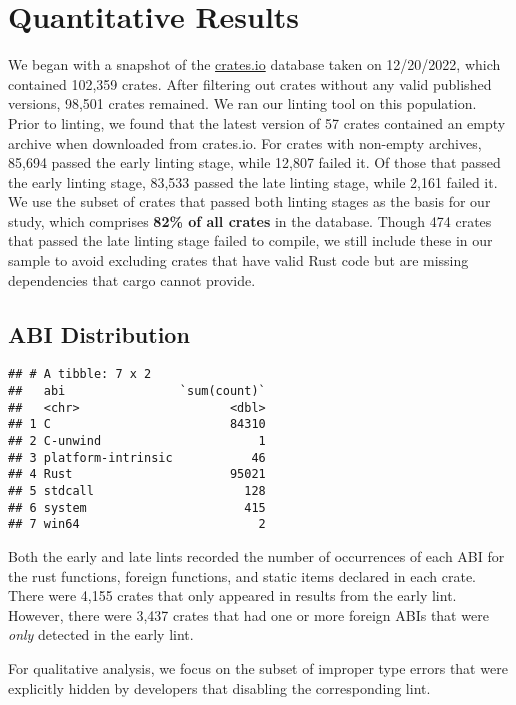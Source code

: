 \documentclass[
]{book}
\begin{document}
\hypertarget{quantitative-results}{%
\chapter{Quantitative Results}\label{quantitative-results}}

We began with a snapshot of the \href{https://crates.io/data-access}{crates.io} database taken on 12/20/2022, which contained 102,359 crates. After filtering out crates without any valid published versions, 98,501 crates remained. We ran our linting tool on this population. Prior to linting, we found that the latest version of 57 crates contained an empty archive when downloaded from crates.io. For crates with non-empty archives, 85,694 passed the early linting stage, while 12,807 failed it. Of those that passed the early linting stage, 83,533 passed the late linting stage, while 2,161 failed it. We use the subset of crates that passed both linting stages as the basis for our study, which comprises \textbf{82\% of all crates} in the database. Though 474 crates that passed the late linting stage failed to compile, we still include these in our sample to avoid excluding crates that have valid Rust code but are missing dependencies that cargo cannot provide.

\hypertarget{abi-distribution-1}{%
\section{ABI Distribution}\label{abi-distribution-1}}

\begin{verbatim}
## # A tibble: 7 x 2
##   abi                `sum(count)`
##   <chr>                     <dbl>
## 1 C                         84310
## 2 C-unwind                      1
## 3 platform-intrinsic           46
## 4 Rust                      95021
## 5 stdcall                     128
## 6 system                      415
## 7 win64                         2
\end{verbatim}

Both the early and late lints recorded the number of occurrences of each ABI for the rust functions, foreign functions, and static items declared in each crate. There were 4,155 crates that only appeared in results from the early lint. However, there were 3,437 crates that had one or more foreign ABIs that were \emph{only} detected in the early lint.

For qualitative analysis, we focus on the subset of improper type errors that
were explicitly hidden by developers that disabling the corresponding lint.

  
\end{document}
